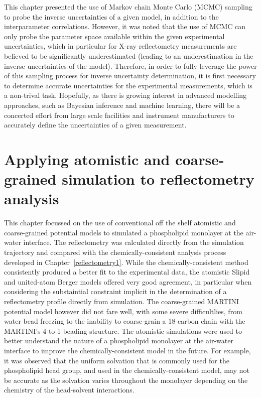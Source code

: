 This chapter presented the use of Markov chain Monte Carlo (MCMC) sampling to probe the inverse uncertainties of a given model, in addition to the interparameter correlations.
However, it was noted that the use of MCMC can only probe the parameter space available within the given experimental uncertainties, which in particular for X-ray reflectometry measurements are believed to be significantly underestimated (leading to an underestimation in the inverse uncertainties of the model).
Therefore, in order to fully leverage the power of this sampling process for inverse uncertainty determination, it is first necessary to determine accurate uncertainties for the experimental measurements, which is a non-trival task.
Hopefully, as there is growing interest in advanced modelling approaches, such as Bayesian inference and machine learning, there will be a concerted effort from large scale facilities and instrument manufacturers to accurately define the uncertainties of a given measurement.

\section{Applying atomistic and coarse-grained simulation to reflectometry analysis}
This chapter focussed on the use of conventional off the shelf atomistic and coarse-grained potential models to simulated a phospholipid monolayer at the air-water interface.
The reflectometry was calculated directly from the simulation trajectory and compared with the chemically-consistent analysis process developed in Chapter~\ref{reflectometry1}.
While the chemically-consistent method consistently produced a better fit to the experimental data, the atomistic Slipid and united-atom Berger models offered very good agreement, in particular when considering the substaintial constraint implicit in the determination of a reflectometry profile directly from simulation.
The coarse-grained MARTINI potential model however did not fare well, with some severe difficultlies, from water bead freezing to the inability to coarse-grain a 18-carbon chain with the MARTINI's 4-to-1 beading structure.
The atomistic simulations were used to better understand the nature of a phospholipid monolayer at the air-water interface to improve the chemically-consistent model in the future.
For example, it was observed that the uniform solvation that is commonly used for the phospholipid head group, and used in the chemically-consistent model, may not be accurate as the solvation varies throughout the monolayer depending on the chemistry of the head-solvent interactions.

